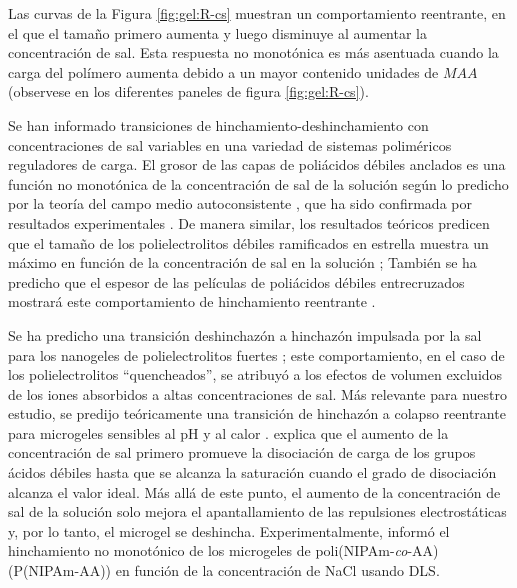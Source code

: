 Las curvas de la Figura \ref{fig:gel:R-cs} muestran un comportamiento reentrante, en el que el tama\~no primero aumenta y luego disminuye al aumentar la concentración de sal.
Esta respuesta no monot\'onica es m\'as asentuada cuando la carga del pol\'imero aumenta debido a un mayor contenido unidades de $MAA$ (observese en los diferentes paneles de figura \ref{fig:gel:R-cs}).



Se han informado transiciones de hinchamiento-deshinchamiento con concentraciones de sal variables en una variedad de sistemas polim\'ericos reguladores de carga.
El grosor de las capas de poli\'acidos d\'ebiles anclados es una funci\'on no monot\'onica de la concentraci\'on de sal de la soluci\'on seg\'un lo predicho por la teor\'ia del campo medio autoconsistente  \cite{Israels1994,Lyatskaya1995,Zhulina1995,Gong2007}, que ha sido confirmada por resultados experimentales \cite{Wu2007}.
De manera similar, los resultados te\'oricos predicen que el tama\~no de los polielectrolitos d\'ebiles ramificados en estrella muestra un m\'aximo en funci\'on de la concentraci\'on de sal en la soluci\'on  \cite{Borisov1998,KleinWolterink2002};
Tambi\'en se ha predicho que el espesor de las pel\'iculas de poliácidos d\'ebiles entrecruzados mostrar\'a este comportamiento de hinchamiento reentrante \cite{Longo2014JCP}.

Se ha predicho una transici\'on deshinchaz\'on a hinchaz\'on impulsada por la sal para los nanogeles de polielectrolitos fuertes \cite{jha2012understanding};
este comportamiento, en el caso de los polielectrolitos ``quencheados'', se atribuy\'o a los efectos de volumen excluidos de los iones absorbidos a altas concentraciones de sal.
M\'as relevante para nuestro estudio, se predijo te\'oricamente una transici\'on de hinchaz\'on a colapso reentrante para microgeles sensibles al pH y al calor \cite{polotsky2013collapse}.
 \citet{polotsky2013collapse} explica que el aumento de la concentraci\'on de sal primero promueve la disociaci\'on de carga de los grupos \'acidos d\'ebiles hasta que se alcanza la saturaci\'on cuando el grado de disociaci\'on alcanza el valor ideal.
M\'as all\'a de este punto, el aumento de la concentraci\'on de sal de la soluci\'on solo mejora el apantallamiento de las repulsiones electrost\'aticas y, por lo tanto, el microgel se deshincha.
Experimentalmente,  \citet{CaprilesGonzalez2008} inform\'o el hinchamiento no monot\'onico de los microgeles de poli(NIPAm-\emph{co}-AA) (P(NIPAm-AA)) en funci\'on de la concentraci\'on de NaCl usando DLS.

